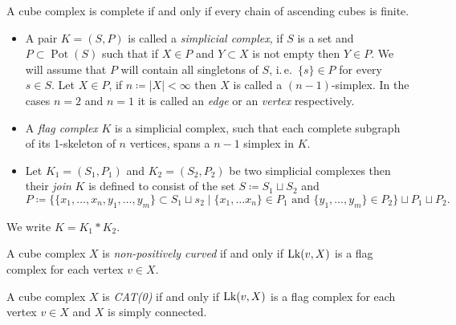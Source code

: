 

\begin{thm}
  A cube complex is complete if and only if every chain of ascending cubes is finite.
\end{thm}


\begin{defin}
  \begin{itemize}
  \item A pair \(K = (S, P)\) is called a \emph{simplicial complex}, if \(S\) is a set and \(P \subset \operatorname{Pot}(S)\) such that if \(X \in P\) and \(Y \subset X\) is not empty then \(Y \in P\). We will assume that \(P\) will contain all singletons of \(S\), i.\,e.\ \(\{s\} \in P\) for every \(s \in S\). Let \(X \in P\), if \(n \coloneqq |X| < \infty\) then \(X\) is called a \((n-1)\)-simplex. In the cases \(n=2\) and \(n=1\) it is called an \emph{edge} or an \emph{vertex} respectively.
  \item A \emph{flag complex} \(K\) is a simplicial complex, such that each complete subgraph of its 1-skeleton of \(n\) vertices, spans a \(n-1\) simplex in \(K\).
  \item Let \(K_1 = (S_1, P_1)\) and \(K_2 = (S_2, P_2)\) be two simplicial complexes then their \emph{join} \(K\) is defined to consist of the set \(S \coloneqq S_1 \sqcup S_2\) and
    \[
      P \coloneqq \{\{x_1, \dots, x_n, y_1, \dots, y_m\} \subset S_1 \sqcup s_2 \mid \{x_1, \dots x_n\} \in P_1 \text{ and } \{y_1, \dots, y_m\} \in P_2\} \sqcup P_1 \sqcup P_2.
    \]
  \end{itemize}
  We write \(K = K_1 \ast K_2\).
\end{defin}

\begin{thm}
  \label{thm:link}
  A cube complex \(X\) is \emph{non-positively curved} if and only if \(\operatorname{Lk}(v,X)\) is a flag complex for each vertex \(v \in X\).

  A cube complex \(X\) is \emph{CAT(0)} if and only if \(\operatorname{Lk}(v,X)\)  is a flag complex for each vertex \(v \in X\) and \(X\) is simply connected.
\end{thm}

